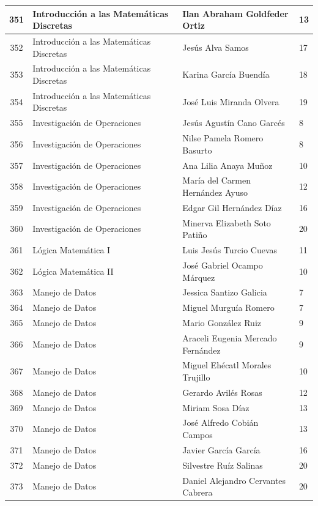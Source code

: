 {\begin{longtable}{|c|p{6.5cm}|p{5cm}|p{1.5cm}|}
  351 & Introducción a las Matemáticas Discretas & Ilan Abraham Goldfeder Ortiz & 13 \\ \hline
  352 & Introducción a las Matemáticas Discretas & Jesús Alva Samos & 17 \\ \hline
  353 & Introducción a las Matemáticas Discretas & Karina García Buendía & 18 \\ \hline
  354 & Introducción a las Matemáticas Discretas & José Luis Miranda Olvera & 19 \\ \hline
  355 & Investigación de Operaciones & Jesús Agustín Cano Garcés & 8 \\ \hline
  356 & Investigación de Operaciones & Nilse Pamela Romero Basurto & 8 \\ \hline
  357 & Investigación de Operaciones & Ana Lilia Anaya Muñoz & 10 \\ \hline
  358 & Investigación de Operaciones & María del Carmen Hernández Ayuso & 12 \\ \hline
  359 & Investigación de Operaciones & Edgar Gil Hernández Díaz & 16 \\ \hline
  360 & Investigación de Operaciones & Minerva Elizabeth Soto Patiño & 20 \\ \hline
  361 & Lógica Matemática I & Luis Jesús Turcio Cuevas & 11 \\ \hline
  362 & Lógica Matemática II & José Gabriel Ocampo Márquez & 10 \\ \hline
  363 & Manejo de Datos & Jessica Santizo Galicia & 7 \\ \hline
  364 & Manejo de Datos & Miguel Murguía Romero & 7 \\ \hline
  365 & Manejo de Datos & Mario González Ruiz & 9 \\ \hline
  366 & Manejo de Datos & Araceli Eugenia Mercado Fernández & 9 \\ \hline
  367 & Manejo de Datos & Miguel Ehécatl Morales Trujillo & 10 \\ \hline
  368 & Manejo de Datos & Gerardo Avilés Rosas & 12 \\ \hline
  369 & Manejo de Datos & Miriam Sosa Díaz & 13 \\ \hline
  370 & Manejo de Datos & José Alfredo Cobián Campos & 13 \\ \hline
  371 & Manejo de Datos & Javier García García & 16 \\ \hline
  372 & Manejo de Datos & Silvestre Ruíz Salinas & 20 \\ \hline
  373 & Manejo de Datos & Daniel Alejandro Cervantes Cabrera & 20 \\ \hline

\end{longtable}}
